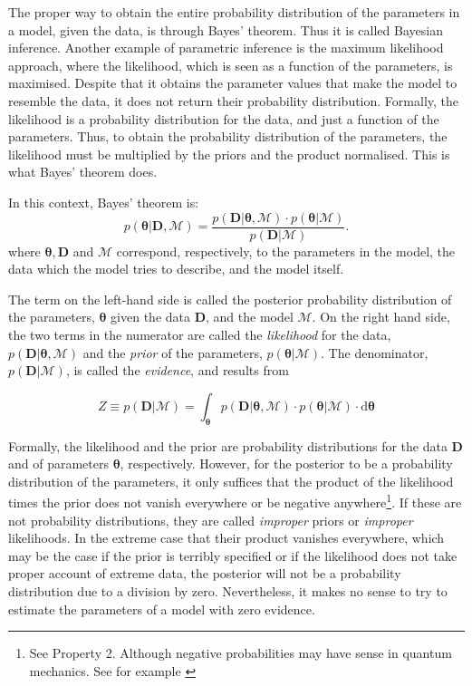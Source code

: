 The proper way to obtain the entire probability distribution of the parameters in a model, given the data, is through Bayes' theorem. Thus it is called Bayesian inference. Another example of parametric inference is the maximum likelihood approach, where the likelihood, which is seen as a function of the parameters, is maximised. Despite that it obtains the parameter values that make the model to resemble the data, it does not return their probability distribution. Formally, the likelihood is a probability distribution for the data, and just a function of the parameters. Thus, to obtain the probability distribution of the parameters, the likelihood must be multiplied by the priors and the product normalised. This is what Bayes' theorem does.

In this context, Bayes' theorem is:
\begin{equation}
p(\boldsymbol{\theta}|\mathbf{D},\mathcal{M}) = \frac{p(\mathbf{D}|\boldsymbol{\theta},\mathcal{M})\cdot p(\boldsymbol{\theta}|\mathcal{M})}{p(\mathbf{D}|\mathcal{M})}.
\end{equation}
where $\boldsymbol{\theta},\mathbf{D}$ and $\mathcal{M}$ correspond, respectively, to the parameters in the model, the data which the model tries to describe, and the model itself. 

The term on the {left-hand side} is called the posterior probability distribution of the parameters, $\boldsymbol{\theta}$ given the data $\mathbf{D}$, and the model $\mathcal{M}$. On the right hand side, the two terms in the numerator are called the \emph{likelihood} for the data, $p(\mathbf{D}|\boldsymbol{\theta},\mathcal{M})$ and the \emph{prior} of the parameters, $p(\boldsymbol{\theta}|\mathcal{M})$. The denominator, $p(\mathbf{D}|\mathcal{M})$, is called the \emph{evidence}, and results from

\begin{equation}
\label{eq:evidence}
Z \equiv p(\mathbf{D}|\mathcal{M}) = \int_{\boldsymbol{\theta}} p(\mathbf{D}|\boldsymbol{\theta},\mathcal{M})\cdot p(\boldsymbol{\theta}|\mathcal{M})\cdot \mathrm{d}\boldsymbol{\theta}
\end{equation} 

Formally, the likelihood and the prior are probability distributions for the data $\mathbf{D}$ and of parameters $\boldsymbol{\theta}$, respectively. However, for the posterior to be a probability distribution of the parameters, it only suffices that the product of the likelihood times the prior does not vanish everywhere or be negative anywhere\footnote{See Property 2. Although negative probabilities may have sense in quantum mechanics. See for example \citet{1942RSPSA.180....1D}}. If these are not probability distributions, they are called \emph{improper} priors or \emph{improper} likelihoods. In the extreme case that their product vanishes everywhere, which may be the case if the prior is terribly specified or if the likelihood does not take proper account of extreme data, the posterior will not be a probability distribution due to a division by zero. Nevertheless, it makes no sense to try to estimate the parameters of a model with zero evidence.

